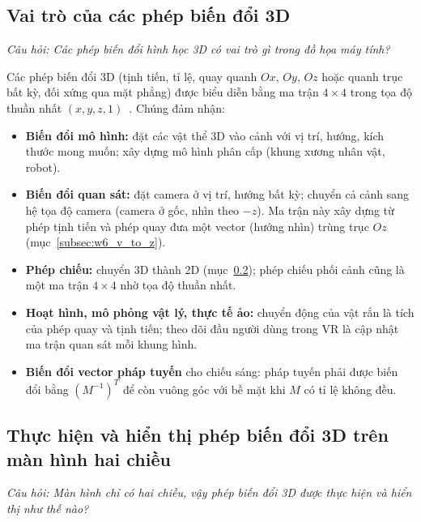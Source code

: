 \subsection{Vai trò của các phép biến đổi 3D}
\label{subsec:w6_3d_role}

\textit{Câu hỏi: Các phép biến đổi hình học 3D có vai trò gì trong đồ họa máy tính?}

Các phép biến đổi 3D (tịnh tiến, tỉ lệ, quay quanh $Ox$, $Oy$, $Oz$ hoặc quanh trục bất kỳ, đối xứng qua mặt phẳng) được biểu diễn bằng ma trận $4 \times 4$ trong tọa độ thuần nhất $(x, y, z, 1)$~\citep{hearn2011computer}. Chúng đảm nhận:
\begin{itemize}
    \item \textbf{Biến đổi mô hình:} đặt các vật thể 3D vào cảnh với vị trí, hướng, kích thước mong muốn; xây dựng mô hình phân cấp (khung xương nhân vật, robot).
    \item \textbf{Biến đổi quan sát:} đặt camera ở vị trí, hướng bất kỳ; chuyển cả cảnh sang hệ tọa độ camera (camera ở gốc, nhìn theo $-z$). Ma trận này xây dựng từ phép tịnh tiến và phép quay đưa một vector (hướng nhìn) trùng trục $Oz$ (mục~\ref{subsec:w6_v_to_z}).
    \item \textbf{Phép chiếu:} chuyển 3D thành 2D (mục~\ref{subsec:w6_3d_on_2d}); phép chiếu phối cảnh cũng là một ma trận $4 \times 4$ nhờ tọa độ thuần nhất.
    \item \textbf{Hoạt hình, mô phỏng vật lý, thực tế ảo:} chuyển động của vật rắn là tích của phép quay và tịnh tiến; theo dõi đầu người dùng trong VR là cập nhật ma trận quan sát mỗi khung hình.
    \item \textbf{Biến đổi vector pháp tuyến} cho chiếu sáng: pháp tuyến phải được biến đổi bằng $(M^{-1})^{T}$ để còn vuông góc với bề mặt khi $M$ có tỉ lệ không đều.
\end{itemize}

\subsection{Thực hiện và hiển thị phép biến đổi 3D trên màn hình hai chiều}
\label{subsec:w6_3d_on_2d}

\textit{Câu hỏi: Màn hình chỉ có hai chiều, vậy phép biến đổi 3D được thực hiện và hiển thị như thế nào?}


